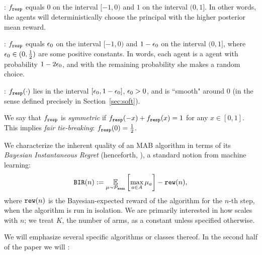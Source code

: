 \begin{OneLiners}
\item \HardMax: $f_{\mathtt{resp}}$ equals $0$ on the interval $[-1,0)$ and $1$
  on the interval $(0,1]$. In other words, the agents will
  deterministically choose the principal with the higher posterior
  mean reward.

\item \HardMaxRandom:
    $f_{\mathtt{resp}}$ equals $\epsilon_0$ on the interval $[-1,0)$ and $1-\epsilon_0$ on the interval $(0,1]$, where $\epsilon_0\in (0,\tfrac12)$ are some positive constants. In words, each agent is a \HardMax agent with probability $1-2\epsilon_0$, and with the remaining probability she makes a random choice.


\item \SoftMaxRandom: $f_{\mathtt{resp}}(\cdot)$ lies in the interval $[\epsilon_0,1-\epsilon_0]$, $\epsilon_0>0$, and is ``smooth" around $0$ (in the sense defined precisely in Section~\ref{sec:soft}).
\end{OneLiners}

We say that $f_{\mathtt{resp}}$ is \emph{symmetric} if $f_{\mathtt{resp}}(-x)+f_{\mathtt{resp}}(x)=1$
for any $x\in [0,1]$. This implies \emph{fair tie-breaking}:
$f_{\mathtt{resp}}(0)=\tfrac12$.%

We characterize the inherent quality of an MAB algorithm in terms of its \emph{Bayesian Instantaneous Regret} (henceforth, \BIR), a standard notion from machine learning:
\begin{align}
\BIR(n) := \E_{\mu\sim\priorMu}
    \left[ \max_{a\in A} \mu_a\right] - \rew(n),
\end{align}
where $\mathtt{rew}(n)$ is the Bayesian-expected reward of the algorithm for the $n$-th step, when the algorithm is run in isolation. We are primarily interested in how \BIR scales with $n$; we treat $K$, the number of arms, as a constant unless specified otherwise.

We will emphasize several specific algorithms or classes thereof. In the second half of the paper we will :


